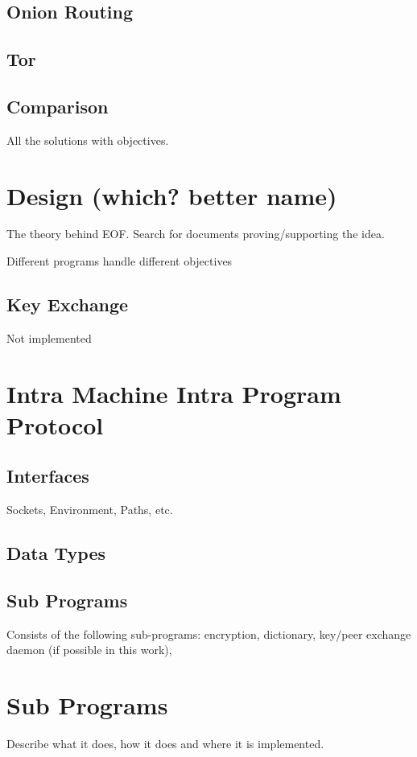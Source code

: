 \documentclass[12pt,a4paper]{article}
\begin{document}
\subsection{Onion Routing}
\subsection{Tor}
\subsection{Comparison}
All the solutions with objectives.

\section{Design (which? better name)}
The theory behind EOF.
Search for documents proving/supporting the idea.

Different programs handle different objectives
\subsection{Key Exchange}
Not implemented
\section{Intra Machine Intra Program Protocol}
\subsection{Interfaces}
Sockets, Environment, Paths, etc.
\subsection{Data Types}
\subsection{Sub Programs}
Consists of the following sub-programs:
encryption, dictionary, key/peer exchange daemon (if possible in this work),
\section{Sub Programs}
Describe what it does, how it does and where it is implemented.
\end{document}
